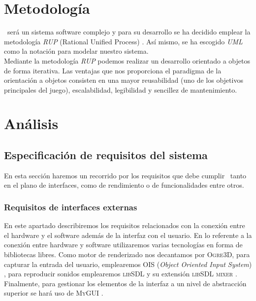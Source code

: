 \section{Metodología}

\juego\ será un sistema software complejo y para su desarrollo se ha decidido
emplear la metodología \textit{RUP} (Rational Unified Process) \cite{larm02}. Así mismo,
se ha escogido \textit{UML} como la notación para modelar nuestro sistema.\\

Mediante la metodología \textit{RUP} podemos realizar un desarrollo orientado
a objetos de forma iterativa. Las ventajas que nos proporciona el paradigma
de la orientación a objetos consisten en una mayor reusabilidad (uno
de los objetivos principales del juego), escalabilidad, legibilidad y
sencillez de mantenimiento.\\

\section{Análisis}
\label{siontower-analisis}

\subsection{Especificación de requisitos del sistema}

En esta sección haremos un recorrido por los requisitos que debe cumplir
\juego\ tanto en el plano de interfaces, como de rendimiento o de
funcionalidades entre otros.\\

\subsubsection{Requisitos de interfaces externas}

En este apartado describiremos los requisitos relacionados con la conexión
entre el hardware y el software además de la interfaz con el usuario. En lo
referente a la conexión entre hardware y software utilizaremos varias tecnologías
en forma de bibliotecas libres. Como motor de renderizado nos decantamos por \textsc{Ogre3D},
para capturar la entrada del usuario, emplearemos \textsc{OIS}
(\textit{Object Oriented Input System}) \cite{website:ois}, para reproducir
sonidos emplearemos \textsc{libSDL} y su extensión \textsc{libSDL mixer} \cite{website:sdl}.
Finalmente, para gestionar los elementos de la interfaz a un nivel de abstracción
superior se hará uso de \textsc{MyGUI} \cite{website:mygui}.\\

